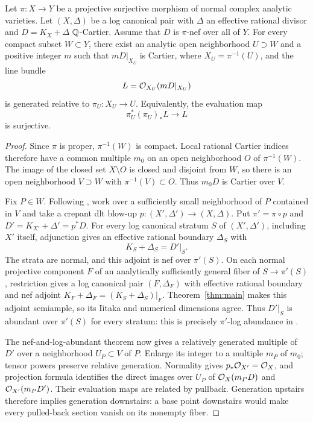 \begin{corollary}
\label{cor:analytic-abundance}
Let \(\pi:X\to Y\) be a projective surjective morphism of normal complex
analytic varieties. Let \((X,\Delta)\) be a log canonical pair with
\(\Delta\) an effective rational divisor and \(D=K_X+\Delta\)
\(\mathbb{Q}\)-Cartier. Assume that \(D\) is \(\pi\)-nef over all of \(Y\).
For every compact subset \(W\subset Y\), there exist an analytic open
neighborhood \(U\supset W\) and a positive integer \(m\) such that
\(mD|_{X_U}\) is Cartier, where \(X_U=\pi^{-1}(U)\), and the line bundle
\[
 L=\mathcal{O}_{X_U}(mD|_{X_U})
\]
is generated relative to \(\pi_U:X_U\to U\). Equivalently, the evaluation
map
\[
 \pi_U^*(\pi_U)_*L\longrightarrow L
\]
is surjective.
\end{corollary}
\begin{proof}
Since \(\pi\) is proper, \(\pi^{-1}(W)\) is compact. Local rational
Cartier indices therefore have a common multiple \(m_0\) on an open
neighborhood \(O\) of \(\pi^{-1}(W)\). The image of the closed set
\(X\setminus O\) is closed and disjoint from \(W\), so there is an
open neighborhood \(V\supset W\) with \(\pi^{-1}(V)\subset O\).
Thus \(m_0D\) is Cartier over \(V\).

Fix \(P\in W\). Following
\cite[the proof of Theorem~1.10, p.~30]{FujinoRelativeAnalytic2025},
work over a sufficiently small neighborhood of \(P\) contained in \(V\)
and take a crepant dlt blow-up
\(p:(X',\Delta')\to(X,\Delta)\). Put \(\pi'=\pi\circ p\) and
\(D'=K_{X'}+\Delta'=p^*D\). For every log canonical stratum \(S\)
of \((X',\Delta')\), including \(X'\) itself, adjunction gives an
effective rational boundary \(\Delta_S\) with
\[
 K_S+\Delta_S=D'|_S.
\]
The strata are normal, and this adjoint is nef over \(\pi'(S)\).
On each normal projective component \(F\) of an analytically sufficiently
general fiber of \(S\to\pi'(S)\), restriction gives a log canonical
pair \((F,\Delta_F)\) with effective rational boundary and nef
adjoint \(K_F+\Delta_F=(K_S+\Delta_S)|_F\).
Theorem~\ref{thm:main} makes this adjoint semiample, so its Iitaka
and numerical dimensions agree. Thus \(D'|_S\) is abundant over
\(\pi'(S)\) for every stratum: this is precisely
\(\pi'\)-log abundance in
\cite[Definitions~2.10 and~2.13]{FujinoRelativeAnalytic2025}.

The nef-and-log-abundant theorem
\cite[Theorem~1.4]{FujinoRelativeAnalytic2025} now gives a relatively
generated multiple of \(D'\) over a neighborhood \(U_P\subset V\)
of \(P\). Enlarge its integer to a multiple \(m_P\) of \(m_0\);
tensor powers preserve relative generation. Normality gives
\(p_*\mathcal{O}_{X'}=\mathcal{O}_X\), and projection formula identifies the direct
images over \(U_P\) of \(\mathcal{O}_X(m_PD)\) and
\(\mathcal{O}_{X'}(m_PD')\). Their evaluation maps are related by pullback.
Generation upstairs therefore implies generation downstairs: a base point
downstairs would make every pulled-back section vanish on its nonempty
fiber.


\end{proof}
